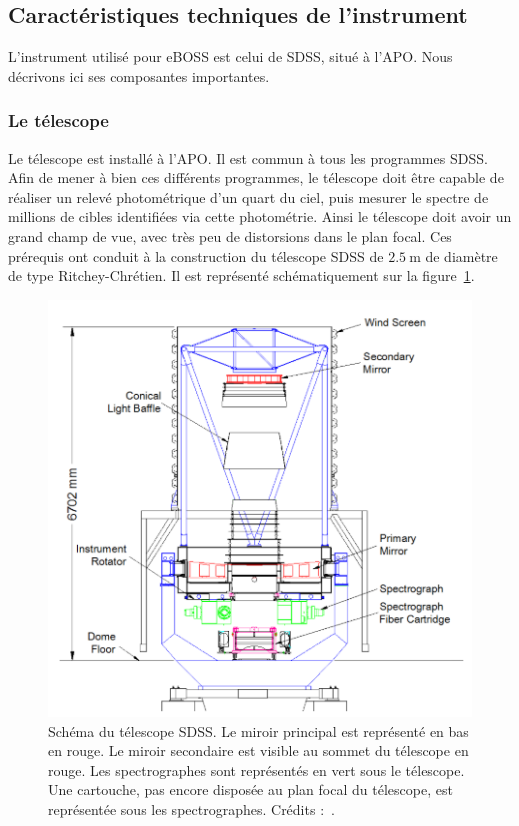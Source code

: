 \subsection{Caractéristiques techniques de l'instrument}
L'instrument \autocite{Gunn2006} utilisé pour eBOSS est celui de SDSS, situé à l'APO. Nous décrivons ici ses composantes importantes.

\subsubsection{Le télescope}
Le télescope est installé à l'APO. Il est commun à tous les programmes SDSS. Afin de mener à bien ces différents programmes, le télescope doit être capable de réaliser un relevé photométrique d'un quart du ciel, puis mesurer le spectre de millions de cibles identifiées via cette photométrie. Ainsi le télescope doit avoir un grand champ de vue, avec très peu de distorsions dans le plan focal. Ces prérequis ont conduit à la construction du télescope SDSS de $\SI{2,5}{\meter}$ de diamètre de type Ritchey-Chrétien. Il est représenté schématiquement sur la figure~\ref{fig:SchemaTelescope}. \\
\begin{figure}
  \centering
  \includegraphics[scale=0.5]{SchemaTelescope}
  \caption{Schéma du télescope SDSS. Le miroir principal est représenté en bas en rouge. Le miroir secondaire est visible au sommet du télescope en rouge. Les spectrographes sont représentés en vert sous le télescope. Une cartouche, pas encore disposée au plan focal du télescope, est représentée sous les spectrographes. Crédits :~\textcite{Smee2012}.}
  \label{fig:SchemaTelescope}
\end{figure}
